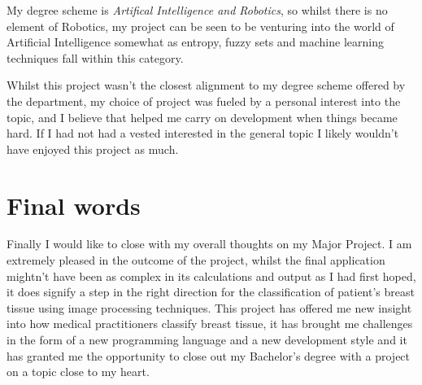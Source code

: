 My degree scheme is \textit{Artifical Intelligence and Robotics}, so whilst there is no element of Robotics, my project can be seen to be venturing into the world of Artificial Intelligence somewhat as entropy, fuzzy sets and machine learning techniques fall within this category.

Whilst this project wasn't the closest alignment to my degree scheme offered by the department, my choice of project was fueled by a personal interest into the topic, and I believe that helped me carry on development when things became hard. If I had not had a vested interested in the general topic I likely wouldn't have enjoyed this project as much.

\section{Final words}

Finally I would like to close with my overall thoughts on my Major Project. I am extremely pleased in the outcome of the project, whilst the final application mightn't have been as complex in its calculations and output as I had first hoped, it does signify a step in the right direction for the classification of patient's breast tissue using image processing techniques. This project has offered me new insight into how medical practitioners classify breast tissue, it has brought me challenges in the form of a new programming language and a new development style and it has granted me the opportunity to close out my Bachelor's degree with a project on a topic close to my heart. 
